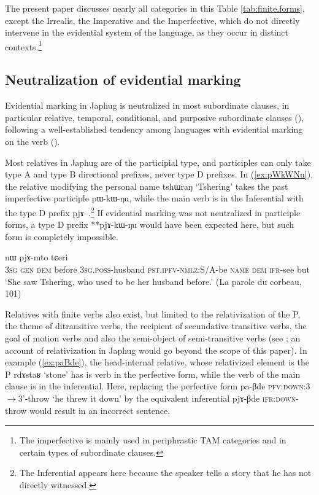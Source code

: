 \documentclass[oldfontcommands,oneside,a4paper,11pt]{article}
\newcommand{\ipa}[1]{{\phon \mbox{#1}}} %
\newcommand{\refb}[1]{(\ref{#1})}
\begin{document}
The present paper discusses nearly all categories in this Table \ref{tab:finite.forms}, except the Irrealis, the Imperative and the Imperfective, which do not directly intervene in the evidential system of the language, as they occur in distinct contexts.\footnote{The imperfective is mainly used in periphrastic TAM categories and in certain types of subordinate clauses.}

\subsection{Neutralization of evidential marking} \label{sec:neutralization}
Evidential marking in Japhug is neutralized in most subordinate clauses, in particular relative, temporal, conditional, and purposive subordinate clauses (\citealt{jacques14linking}), following a well-established tendency among languages with evidential marking on the verb (\citealt[253-6]{aikhenvald06}).

Most relatives in Japhug are of the participial type, and participles can only take type A and type B directional prefixes, never type D prefixes. In \refb{ex:pWkWNu}, the relative modifying the personal name \ipa{tshɯraŋ} `Tshering' takes the past imperfective participle \ipa{pɯ-kɯ-ŋu}, while the main verb is in the Inferential with the type D prefix \ipa{pjɤ--}.\footnote{The Inferential appears here because the speaker tells a story that he has not directly witnessed.} If evidential marking was not neutralized in participle forms, a type D prefix **\ipa{pjɤ-kɯ-ŋu} would have been expected here, but such form is completely impossible.


\begin{exe}
\ex \label{ex:pWkWNu}
\gll [\ipa{ɯʑo} \ipa{ɣɯ}	\ipa{nɯ} \ipa{ɕɯŋgɯ} 	\ipa{ɯ-nmaʁ}  \ipa{pɯ-kɯ-ŋu}] 	\ipa{tshɯraŋ} 	\ipa{nɯ} 	\ipa{pjɤ-mto} \ipa{tɕeri}	\\
\textsc{3sg} \textsc{gen} \textsc{dem} before \textsc{3sg.poss}-husband \textsc{pst.ipfv-nmlz}:S/A-be \textsc{name} \textsc{dem} \textsc{ifr}-see but \\
\glt `She saw Tshering, who used to be her husband before.' (La parole du corbeau, 101)
\end{exe}

Relatives with finite verbs also exist, but limited to the relativization of the P, the theme of ditransitive verbs, the recipient of secundative transitive verbs, the goal of motion verbs and also the semi-object of semi-transitive verbs (see \citealt{jacques16relatives}; an account of relativization in Japhug would go beyond the scope of this paper). In example \refb{ex:paBde}, the head-internal relative, whose relativized element is the P \ipa{rdɤstaʁ}  `stone' has is verb in the perfective form, while the verb of the main clause is in the inferential. Here, replacing the perfective form \ipa{pa-βde} \textsc{pfv:down}:3$\rightarrow$3'-throw `he threw it down' by the equivalent inferential \ipa{pjɤ-βde}  \textsc{ifr:down}-throw would result in an incorrect sentence.
\end{document}
